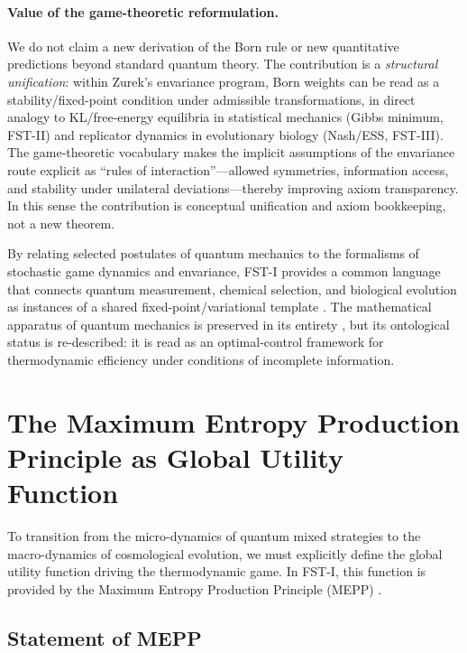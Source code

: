 \documentclass[12pt,a4paper]{article}
\theoremstyle{remark}
\begin{document}
\paragraph{Value of the game-theoretic reformulation.}
We do not claim a new derivation of the Born rule or new quantitative predictions beyond standard quantum theory. The contribution is a \emph{structural unification}: within Zurek's envariance program, Born weights can be read as a stability/fixed-point condition under admissible transformations, in direct analogy to KL/free-energy equilibria in statistical mechanics (Gibbs minimum, FST-II) and replicator dynamics in evolutionary biology (Nash/ESS, FST-III). The game-theoretic vocabulary makes the implicit assumptions of the envariance route explicit as ``rules of interaction''---allowed symmetries, information access, and stability under unilateral deviations---thereby improving axiom transparency. In this sense the contribution is conceptual unification and axiom bookkeeping, not a new theorem.

By relating selected postulates of quantum mechanics to the formalisms of stochastic game dynamics and envariance, FST-I provides a common language that connects quantum measurement, chemical selection, and biological evolution as instances of a shared fixed-point/variational template \citep{SchlossFine2005}. The mathematical apparatus of quantum mechanics is preserved in its entirety \citep{QuantumOptimization}, but its ontological status is re-described: it is read as an optimal-control framework for thermodynamic efficiency under conditions of incomplete information.

\section{The Maximum Entropy Production Principle as Global Utility Function}
\label{sec:mepp}

To transition from the micro-dynamics of quantum mixed strategies to the macro-dynamics of cosmological evolution, we must explicitly define the global utility function driving the thermodynamic game. In FST-I, this function is provided by the Maximum Entropy Production Principle (MEPP) \citep{MEPP2004}.

\subsection{Statement of MEPP}
\end{document}
